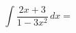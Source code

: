 \documentclass[../rgr1.tex]{subfiles}
\begin{document}
\Solution

\begin{equation}
	\int \frac{2x + 3}{1 - 3x^2} \, dx =
\end{equation}

\Answer{
	<++>
}
\end{document}
